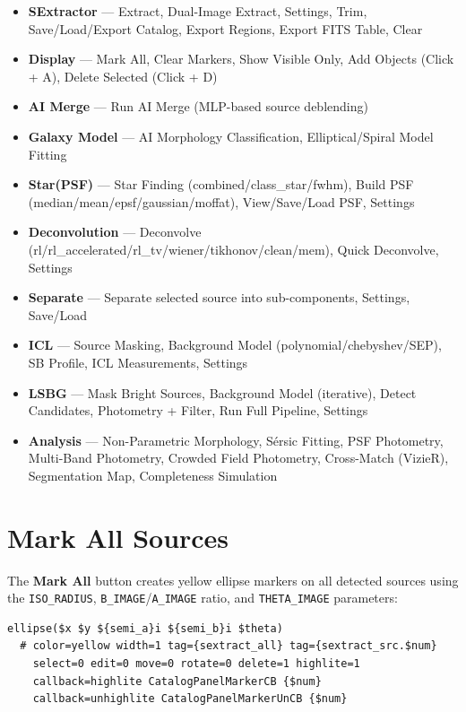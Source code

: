 \documentclass[11pt,fleqn]{book}
\begin{document}
\begin{itemize}
\item \textbf{SExtractor} --- Extract, Dual-Image Extract, Settings, Trim, Save/Load/Export Catalog, Export Regions, Export FITS Table, Clear
\item \textbf{Display} --- Mark All, Clear Markers, Show Visible Only, Add Objects (Click + A), Delete Selected (Click + D)
\item \textbf{AI Merge} --- Run AI Merge (MLP-based source deblending)
\item \textbf{Galaxy Model} --- AI Morphology Classification, Elliptical/Spiral Model Fitting
\item \textbf{Star(PSF)} --- Star Finding (combined/class\_star/fwhm), Build PSF (median/mean/epsf/gaussian/moffat), View/Save/Load PSF, Settings
\item \textbf{Deconvolution} --- Deconvolve (rl/rl\_accelerated/rl\_tv/wiener/tikhonov/clean/mem), Quick Deconvolve, Settings
\item \textbf{Separate} --- Separate selected source into sub-components, Settings, Save/Load
\item \textbf{ICL} --- Source Masking, Background Model (polynomial/chebyshev/SEP), SB Profile, ICL Measurements, Settings
\item \textbf{LSBG} --- Mask Bright Sources, Background Model (iterative), Detect Candidates, Photometry + Filter, Run Full Pipeline, Settings
\item \textbf{Analysis} --- Non-Parametric Morphology, S\'ersic Fitting, PSF Photometry, Multi-Band Photometry, Crowded Field Photometry, Cross-Match (VizieR), Segmentation Map, Completeness Simulation
\end{itemize}


\section{Mark All Sources}

The \textbf{Mark All} button creates yellow ellipse markers on all detected sources using the \texttt{ISO\_RADIUS}, \texttt{B\_IMAGE}/\texttt{A\_IMAGE} ratio, and \texttt{THETA\_IMAGE} parameters:

\begin{codebox}
\begin{lstlisting}[style=tcl,numbers=none]
ellipse($x $y ${semi_a}i ${semi_b}i $theta)
  # color=yellow width=1 tag={sextract_all} tag={sextract_src.$num}
    select=0 edit=0 move=0 rotate=0 delete=1 highlite=1
    callback=highlite CatalogPanelMarkerCB {$num}
    callback=unhighlite CatalogPanelMarkerUnCB {$num}
\end{lstlisting}
\end{codebox}
\end{document}
